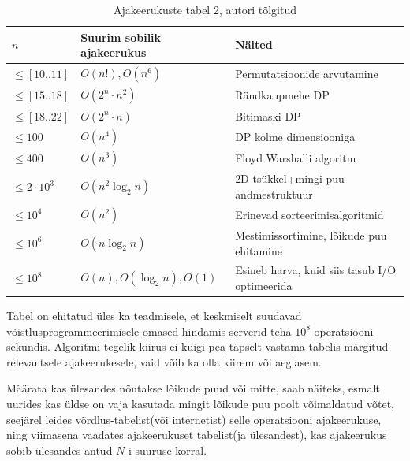 \documentclass{trkut}
\begin{document}
\begin{table}[H]%
   \caption{Ajakeerukuste tabel 2, autori tõlgitud}%
    \begin{tabular}{|l|l|l|}
\hline
$n$               & Suurim sobilik ajakeerukus & Näited                                          \\ \hline
$\le [10..11]$    & $O(n!), O(n^6)$            & Permutatsioonide arvutamine                     \\ \hline
$\le [15..18]$    & $O(2^n\cdot n^2)$          & Rändkaupmehe DP                                 \\ \hline
$\le [18..22]$    & $O(2^n\cdot n)$            & Bitimaski DP                                    \\ \hline
$\le 100$         & $O(n^4)$                   & DP kolme dimensiooniga                          \\ \hline
$\le 400$         & $O(n^3)$                   & Floyd Warshalli algoritm                        \\ \hline
$\le 2\cdot 10^3$ & $O(n^2\log _2 n)$          & 2D tsükkel+mingi puu andmestruktuur             \\ \hline
$\le 10^4$        & $O(n^2)$                   & Erinevad sorteerimisalgoritmid                  \\ \hline
$\le 10^6$        & $O(n\log _2 n)$            & Mestimissortimine, lõikude puu ehitamine        \\ \hline
$\le 10^8$        & $O(n), O(\log _2 n), O(1)$ & Esineb harva, kuid siis tasub I/O optimeerida \\ \hline
\end{tabular}
    \label{idk}%
\end{table}


Tabel on ehitatud üles ka teadmisele, et keskmiselt suudavad võistlusprogrammeerimisele omased hindamis-serverid teha $10^8$ operatsiooni sekundis. Algoritmi tegelik kiirus ei kuigi pea täpselt vastama tabelis märgitud relevantsele ajakeerukesele, vaid võib ka olla kiirem või aeglasem.

Määrata kas ülesandes nõutakse lõikude puud või mitte, saab näiteks, esmalt uurides kas üldse on vaja kasutada mingit lõikude puu poolt võimaldatud võtet, seejärel leides võrdlus-tabelist(või internetist) selle operatsiooni ajakeerukuse, ning viimasena vaadates ajakeerukuset tabelist(ja ülesandest), kas ajakeerukus sobib ülesandes antud $N$-i suuruse korral.
\end{document}
